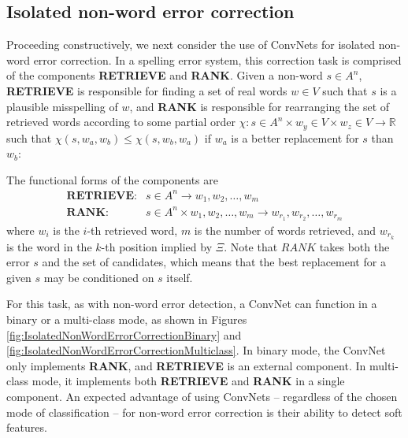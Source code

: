 \subsection{Isolated non-word error correction}

Proceeding constructively, we next consider the use of ConvNets for isolated non-word error correction.   In a spelling error system, this correction task is comprised of the components \textbf{RETRIEVE} and \textbf{RANK}.  Given a non-word $s \in A^n$, \textbf{RETRIEVE} is responsible for finding a set of real words $w \in V$ such that $s$ is a plausible misspelling of $w$, and \textbf{RANK} is responsible for rearranging the set of retrieved words according to some partial order $\chi: s \in A^n \times w_y \in V \times w_z \in V \to \mathbb{R}$ such that $\chi(s, w_a, w_b) \le \chi(s, w_b, w_a)$ if $w_a$ is a better replacement for $s$ than $w_b$:

The functional forms of the components are
\begin{align*}
\textbf{RETRIEVE}: & s \in A^n \to w_1, w_2, \ldots, w_m \\
\textbf{RANK}: & s \in A^n \times w_1, w_2, \ldots, w_m \to w_{r_1}, w_{r_2}, \ldots, w_{r_m}
\end{align*}
where $w_i$ is the $i$-th retrieved word, $m$ is the number of words retrieved, and $w_{r_k}$ is the word in the $k$-th position implied by $\Xi$.  Note that $RANK$ takes both the error $s$ and the set of candidates, which means that the best replacement for a given $s$ may be conditioned on $s$ itself. 

For this task, as with non-word error detection, a ConvNet can function in a binary or a multi-class mode, as shown in Figures \ref{fig:IsolatedNonWordErrorCorrectionBinary} and \ref{fig:IsolatedNonWordErrorCorrectionMulticlass}.  In binary mode, the ConvNet only implements \textbf{RANK}, and \textbf{RETRIEVE} is an external component.  In multi-class mode, it implements both \textbf{RETRIEVE} and \textbf{RANK} in a single component.  An expected advantage of using ConvNets -- regardless of the chosen mode of classification -- for non-word error correction is their ability to detect soft features.  

